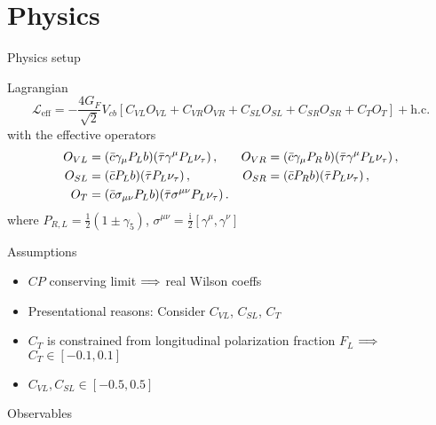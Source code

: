 \section{Physics}

\begin{frame}{Physics setup}
	\begin{block}{Lagrangian}
	\begin{equation*}\label{eq:Lbc}
	\mathcal{L}_\text{eff} = -\frac{4G_F}{\sqrt{2}}V_{cb}\left[C_{VL}O_{VL}+C_{VR}O_{VR}+C_{SL}O_{SL}+C_{SR}O_{SR}+C_{T}O_{T}\right]+\text{h.c.}
	\end{equation*}
	with the effective operators
	\begin{align*}
	O_{VL}&= (\bar c \gamma_\mu P_L b)(\bar \tau \gamma^\mu P_L \nu_\tau)\,, &  O_{VR}&= (\bar c \gamma_\mu P_R \,b)(\bar \tau \gamma^\mu P_L \nu_\tau)\,,\notag\\
	O_{SL}&= (\bar c P_L b)(\bar \tau  P_L \nu_\tau)\,,& O_{SR}&= (\bar c  P_R b)(\bar \tau  P_L \nu_\tau)\,, \\
	O_{T}&= (\bar c \sigma_{\mu\nu} P_L b)(\bar \tau \sigma^{\mu\nu} P_L \nu_\tau)\,. &\notag
	\end{align*} 
	where $P_{R,L}=\frac{1}{2}(1\pm\gamma_5)$, $\sigma^{\mu\nu}=\frac{\mathrm i}{2}[\gamma^\mu,\gamma^\nu]$
	
	\end{block}
	\begin{block}{Assumptions}
	\begin{itemize}
		\item $CP$ conserving limit $\Longrightarrow$ real Wilson coeffs
		\item Presentational reasons: Consider $C_{VL}$, $C_{SL}$, $C_T$
		\item $C_T$ is constrained from longitudinal polarization fraction $F_L$ $\Longrightarrow$ $C_T\in [-0.1, 0.1]$
		\item $C_{VL}, C_{SL}\in [-0.5, 0.5]$
	\end{itemize}
	\end{block}
\end{frame}

\begin{frame}{Observables}
	
\end{frame}